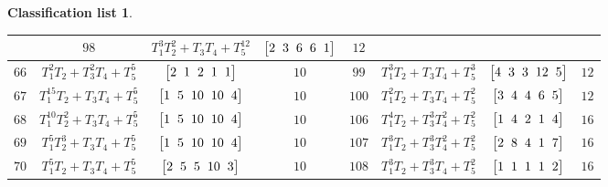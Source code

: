 \documentclass[pdftex]{sigma}%
\theoremstyle{definition}
\newtheorem{class-list}[thm]{Classification list}
\numberwithin{equation}{section}
\begin{document}
\begin{class-list}
\begin{table}[t!]
\begin{tabu}{c|c|c|c||c|c|c|c}
&${98}$&${T_{1}^{3}T_{2}^{2}+T_{3}T_{4}+T_{5}^{12}}$
&$\arraycolsep=1mm\begin{bmatrix}{2} & {3} & {6} & {6} & {1}\end{bmatrix}$&${12}$
\\
\hline
${66}$&${T_{1}^{2}T_{2}+T_{3}^{2}T_{4}+T_{5}^{5}}$
&$\arraycolsep=1mm\begin{bmatrix}{2} & {1} & {2} & {1} & {1}\end{bmatrix}$&${10}$
&${99}$&${T_{1}^{3}T_{2}+T_{3}T_{4}+T_{5}^{3}}$
&$\arraycolsep=1mm\begin{bmatrix}{4} & {3} & {3} & {12} & {5}\end{bmatrix}$&${12}$
\\
\hline
${67}$&${T_{1}^{15}T_{2}+T_{3}T_{4}+T_{5}^{5}}$
&$\arraycolsep=1mm\begin{bmatrix}{1} & {5} & {10} & {10} & {4}\end{bmatrix}$&${10}$
&${100}$&${T_{1}^{2}T_{2}+T_{3}T_{4}+T_{5}^{2}}$
&$\arraycolsep=1mm\begin{bmatrix}{3} & {4} & {4} & {6} & {5}\end{bmatrix}$&${12}$
\\
\hline
${68}$&${T_{1}^{10}T_{2}^{2}+T_{3}T_{4}+T_{5}^{5}}$
&$\arraycolsep=1mm\begin{bmatrix}{1} & {5} & {10} & {10} & {4}\end{bmatrix}$&${10}$
&${106}$&${T_{1}^{4}T_{2}+T_{3}^{3}T_{4}^{2}+T_{5}^{2}}$
&$\arraycolsep=1mm\begin{bmatrix}{1} & {4} & {2} & {1} & {4}\end{bmatrix}$&${16}$
\\
\hline
${69}$&${T_{1}^{5}T_{2}^{3}+T_{3}T_{4}+T_{5}^{5}}$
&$\arraycolsep=1mm\begin{bmatrix}{1} & {5} & {10} & {10} & {4}\end{bmatrix}$&${10}$
&${107}$&${T_{1}^{3}T_{2}+T_{3}^{3}T_{4}^{2}+T_{5}^{2}}$
&$\arraycolsep=1mm\begin{bmatrix}{2} & {8} & {4} & {1} & {7}\end{bmatrix}$&${16}$
\\
\hline
${70}$&${T_{1}^{5}T_{2}+T_{3}T_{4}+T_{5}^{5}}$
&$\arraycolsep=1mm\begin{bmatrix}{2} & {5} & {5} & {10} & {3}\end{bmatrix}$&${10}$
&${108}$&${T_{1}^{3}T_{2}+T_{3}^{3}T_{4}+T_{5}^{2}}$
&$\arraycolsep=1mm\begin{bmatrix}{1} & {1} & {1} & {1} & {2}\end{bmatrix}$&${16}$

\end{tabu}
\end{table}
\end{class-list}
\end{document}
